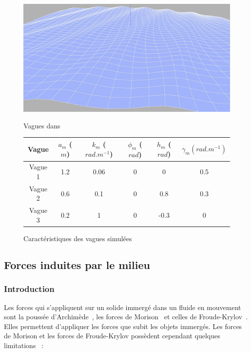 				\begin{figure}[!htb]
					\begin{minipage}[c]{0.45\textwidth}
						\centering
						\includegraphics[width=\textwidth]{imgs/gerstner.jpg}
						\caption{Vagues dans \gazebo{}}
						\label{fig:Gerstner}
					\end{minipage} \hfill
					\begin{minipage}[c]{0.54\textwidth}
						\centering
						\begin{adjustbox}{max width=\textwidth}
							\begin{tabular}{c c c c c c}
								\toprule
								\textbf{Vague} & $a_m$ ($m$) & $k_m$ ($rad.m^{-1}$) & $\phi_m$ ($rad$) & $h_m$ ($rad$) & $\gamma_m (rad.m^{-1})$ \\
								\midrule
								Vague 1 & 1.2 & 0.06 & 0 & 0 & 0.5\\
								Vague 2 & 0.6 & 0.1 & 0 & 0.8 & 0.3\\
								Vague 3 & 0.2 & 1 & 0 & -0.3 & 0\\
								\bottomrule
							\end{tabular}
						\end{adjustbox}
						\caption{Caractéristiques des vagues simulées}
						\label{table:wave}
					\end{minipage}
				\end{figure}

		\subsection{Forces induites par le milieu}

			\subsubsection{Introduction}
			
				Les forces qui s'appliquent sur un solide immergé dans un fluide en mouvement sont la poussée d'Archimède~\cite{dean1991water}, les forces de Morison~\cite{morison1950force, dean1991water} et celles de Froude-Krylov~\cite{dean1991water}. Elles permettent d'appliquer les forces que subit les objets immergés. Les forces de Morison et les forces de Froude-Krylov possèdent cependant quelques limitations~\cite{dean1991water, sarpkaya2010wave} :

